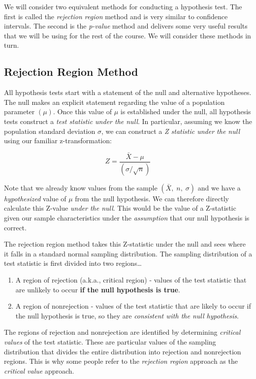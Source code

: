 \documentclass[
]{book}
\begin{document}
We will consider two equivalent methods for conducting a hypothesis test. The first is called the \emph{rejection region} method and is very similar to confidence intervals. The second is the \emph{p-value} method and delivers some very useful results that we will be using for the rest of the course. We will consider these methods in turn.

\hypertarget{rejection-region-method}{%
\subsection{Rejection Region Method}\label{rejection-region-method}}

All hypothesis tests start with a statement of the null and alternative hypotheses. The null makes an explicit statement regarding the value of a population parameter \((\mu)\). Once this value of \(\mu\) is established under the null, all hypothesis tests construct a \emph{test statistic under the null}. In particular, assuming we know the population standard deviation \(\sigma\), we can construct a \emph{Z statistic under the null} using our familiar z-transformation:

\[Z = \frac{\bar{X}-\mu}{\left(\sigma / \sqrt{n} \right)}\]

Note that we already know values from the sample \((\bar{X},\;n,\;\sigma)\) and we have a \emph{hypothesized} value of \(\mu\) from the null hypothesis. We can therefore directly calculate this Z-value \emph{under the null}. This would be the value of a Z-statistic given our sample characteristics under the \emph{assumption} that our null hypothesis is correct.

The rejection region method takes this Z-statistic under the null and sees where it falls in a standard normal sampling distribution. The sampling distribution of a test statistic is first divided into two regions\ldots{}

\begin{enumerate}
\def\labelenumi{\arabic{enumi}.}
\item
  A region of rejection (a.k.a., critical region) - values of the test statistic that are unlikely to occur \textbf{if the null hypothesis is true}.
\item
  A region of nonrejection - values of the test statistic that are likely to occur if the null hypothesis is true, so they are \emph{consistent with the null hypothesis}.
\end{enumerate}

The regions of rejection and nonrejection are identified by determining \emph{critical values} of the test statistic. These are particular values of the sampling distribution that divides the entire distribution into rejection and nonrejection regions. This is why some people refer to the \emph{rejection region} approach as the \emph{critical value} approach.
\end{document}
